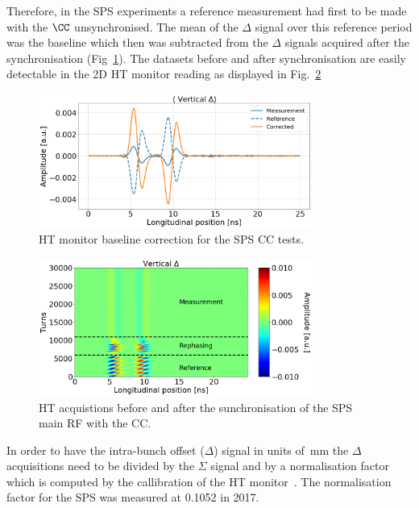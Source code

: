 Therefore, in the SPS experiments a reference measurement had first to be made with the $\CC$ unsynchronised. The mean of the $\Delta$ signal over this reference period was the baseline which then was subtracted from the $\Delta$ signals acquired after the synchronisation (Fig~\ref{fig:HT_baseline_correction}). The datasets before and after synchronisation are easily detectable in the 2D HT monitor reading as displayed in Fig.~\ref{fig:HT_baseline_correction_measurements_2D}

\begin{figure}[!h]
   \centering         
   \includegraphics[width=0.8\textwidth]{images/Ch4/HT_measures_vs_reference_vs_corrected__20180530_114730_baseline_correction.png}
       \caption{HT monitor baseline correction for the SPS CC tests.}
       \label{fig:HT_baseline_correction}
\end{figure}

\begin{figure}[!h]
   \centering         
   \includegraphics[width=0.8\textwidth]{images/Ch4/HT_measures_vs_reference_vs_corrected__20180530_114730_baseline_correction_onlyDelta.png}
       \caption{HT acquistions before and after the sunchronisation of the SPS main RF with the CC.}
       \label{fig:HT_baseline_correction_measurements_2D}
\end{figure}


In order to have the intra-bunch offset ($\Delta$) signal in units of \,mm the $\Delta$ acquisitions need to be divided by the $\Sigma$ signal and by a normalisation factor which is computed by the callibration of the HT monitor~\cite{PhysRevAccelBeams.22.112803}. The normalisation factor for the SPS was measured at 0.1052 in 2017. %
 





